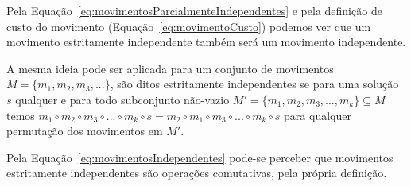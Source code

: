 Pela Equação~\ref{eq:movimentosParcialmenteIndependentes} e pela definição de custo do movimento (Equação~\ref{eq:movimentoCusto}) podemos ver que um movimento estritamente independente também será um movimento independente.

A mesma ideia pode ser aplicada para um conjunto de movimentos $M = \{ m_1, m_2, m_3, ...\}$, são ditos estritamente independentes se para uma solução $s$ qualquer e para todo subconjunto não-vazio $M' = \{ m_1, m_2, m_3, \dots, m_k \} \subseteq M$ temos $m_1 \circ m_2 \circ m_3 \circ ...\circ m_k \circ s = m_2 \circ m_1 \circ m_3 \circ ...\circ m_k \circ s$ para qualquer permutação dos movimentos em $M'$.

Pela Equação~\ref{eq:movimentosIndependentes} pode-se perceber que movimentos estritamente independentes são operações comutativas, pela própria definição.
